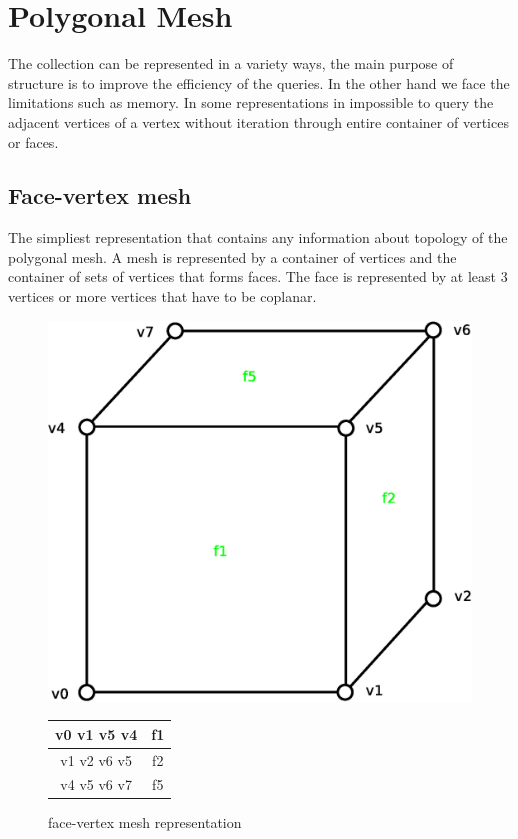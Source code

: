 \section{Polygonal Mesh}

The collection can be represented in a variety ways, the main purpose of structure is to improve
the efficiency of the queries. In the other hand we face the limitations such as memory. In some
representations in impossible to query the adjacent vertices of a vertex without iteration through
entire container of vertices or faces.

\subsection{Face-vertex mesh}
\label{sec:face-vertex}

The simpliest representation that contains any information about topology of the polygonal
mesh. A mesh is represented by a container of vertices and the container of sets of vertices that
forms faces\cite{Zara2004}. The face is represented by at least 3 vertices or more vertices that have to be
coplanar.\\

\begin{figure}[h]

\begin{minipage}[hb]{0.65\linewidth}
\centering
\includegraphics[width=0.6\linewidth]{../img/fv_rep_mesh.eps}
\label{fig:figure1}
\end{minipage}
\hspace{0.5cm}
\begin{minipage}[hb]{0.25\linewidth}
\centering
\begin{tabular}{|c|c|}
\hline
\textsf{v0 v1 v5 v4} & \textsf{f1}\\
\hline
\textsf{v1 v2 v6 v5} & \textsf{f2}\\
\hline
\textsf{v4 v5 v6 v7} & \textsf{f5}\\
\hline
\end{tabular}
\label{fig:fv_mesh}
\end{minipage}

\caption{face-vertex mesh representation}
\end{figure}

